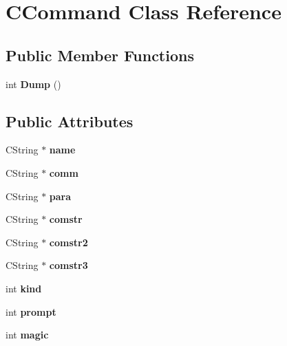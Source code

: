 \hypertarget{class_c_command}{\section{C\-Command Class Reference}
\label{class_c_command}
}
\subsection*{Public Member Functions}
\begin{DoxyCompactItemize}
\item 
\hypertarget{class_c_command_a2866a80d0d462af5face7272f1064218}{int {\bfseries Dump} ()}\label{class_c_command_a2866a80d0d462af5face7272f1064218}

\end{DoxyCompactItemize}
\subsection*{Public Attributes}
\begin{DoxyCompactItemize}
\item 
\hypertarget{class_c_command_aebe62eee263cfe8a9ec32174a9c44f4e}{C\-String $\ast$ {\bfseries name}}\label{class_c_command_aebe62eee263cfe8a9ec32174a9c44f4e}

\item 
\hypertarget{class_c_command_a8d3bff436211dc97344f3fa3bfb44f77}{C\-String $\ast$ {\bfseries comm}}\label{class_c_command_a8d3bff436211dc97344f3fa3bfb44f77}

\item 
\hypertarget{class_c_command_a3c20731d431c75656905aa566d6de6e8}{C\-String $\ast$ {\bfseries para}}\label{class_c_command_a3c20731d431c75656905aa566d6de6e8}

\item 
\hypertarget{class_c_command_a3256d43f71c3db445fe95cb520786000}{C\-String $\ast$ {\bfseries comstr}}\label{class_c_command_a3256d43f71c3db445fe95cb520786000}

\item 
\hypertarget{class_c_command_ac78d345ce690b1aaa982831e81dc1d15}{C\-String $\ast$ {\bfseries comstr2}}\label{class_c_command_ac78d345ce690b1aaa982831e81dc1d15}

\item 
\hypertarget{class_c_command_ae7caeb945bb4bf2217e9d26732615d91}{C\-String $\ast$ {\bfseries comstr3}}\label{class_c_command_ae7caeb945bb4bf2217e9d26732615d91}

\item 
\hypertarget{class_c_command_ab1c7ae1629237d49fcae27b85da63556}{int {\bfseries kind}}\label{class_c_command_ab1c7ae1629237d49fcae27b85da63556}

\item 
\hypertarget{class_c_command_a7926b945c66e6c5a501c9c4f75c4d14b}{int {\bfseries prompt}}\label{class_c_command_a7926b945c66e6c5a501c9c4f75c4d14b}

\item 
\hypertarget{class_c_command_a6614691b1eff75d02925d1fd5a8c0067}{int {\bfseries magic}}\label{class_c_command_a6614691b1eff75d02925d1fd5a8c0067}

\end{DoxyCompactItemize}
